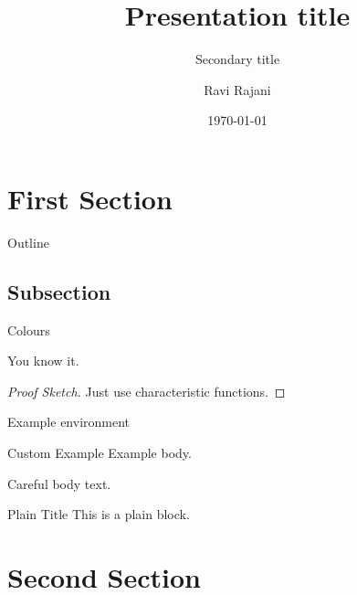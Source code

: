 \documentclass[9pt]{slides} %
\title
{Presentation title}
\subtitle
{Secondary title}
\author
{Ravi Rajani}
\institute
{Department of Mathematics}
\date{\today}
\begin{document}
\begin{frame}
  \titlepage
\end{frame}

\section{First Section}

\begin{frame}{Outline}
  \tableofcontents[currentsection]
\end{frame}

\subsection{Subsection}

\begin{frame}{Colours}
\begin{theorem}
You know it. 
\end{theorem}
\begin{proof}[Proof Sketch]
Just use characteristic functions.
\end{proof}
\begin{example}
Example environment
\end{example}
\begin{minipage}{.5\textwidth}
  \begin{exampleblock}{Custom Example}
    Example body.
    \end{exampleblock}
\end{minipage}
\begin{alertblock}{Careful}
  body text.
\end{alertblock}
\begin{plainblock}{Plain Title}
This is a plain block.
\end{plainblock}
\end{frame}

\section{Second Section}
\end{document}
